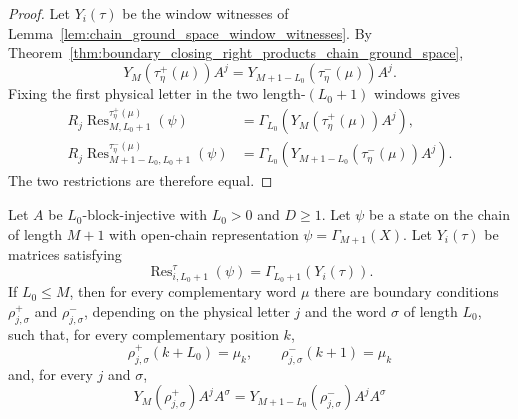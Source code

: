 \begin{proof}
    \notready
    Let $Y_i(\tau)$ be the window witnesses of
    Lemma~\ref{lem:chain_ground_space_window_witnesses}.  By
    Theorem~\ref{thm:boundary_closing_right_products_chain_ground_space},
    \[
        Y_M(\tau^+_\eta(\mu))A^j
        =
        Y_{M+1-L_0}(\tau^-_\eta(\mu))A^j .
    \]
    Fixing the first physical letter in the two length-$(L_0+1)$ windows gives
    \[
    \begin{aligned}
        R_j\operatorname{Res}^{\tau^+_\eta(\mu)}_{M,L_0+1}(\psi)
        &=
        \Gamma_{L_0}\!\left(Y_M(\tau^+_\eta(\mu))A^j\right),\\
        R_j\operatorname{Res}^{\tau^-_\eta(\mu)}_{M+1-L_0,L_0+1}(\psi)
        &=
        \Gamma_{L_0}\!\left(Y_{M+1-L_0}(\tau^-_\eta(\mu))A^j\right).
    \end{aligned}
    \]
    The two restrictions are therefore equal.
\end{proof}

\begin{theorem}
    \label{thm:closure_property_auxiliary_boundary_product_chain_ground_space}
    \leanok
    Let $A$ be $L_0$-block-injective with $L_0>0$ and $D\ge1$. Let $\psi$ be a
    state on the chain of length $M+1$ with open-chain representation
    $\psi=\Gamma_{M+1}(X)$.  Let $Y_i(\tau)$ be matrices satisfying
    \[
        \operatorname{Res}^{\tau}_{i,L_0+1}(\psi)
        =
        \Gamma_{L_0+1}(Y_i(\tau)).
    \]
    If $L_0\le M$, then for every complementary word $\mu$ there are boundary
    conditions $\rho^+_{j,\sigma}$ and $\rho^-_{j,\sigma}$, depending on the
    physical letter $j$ and the word $\sigma$ of length $L_0$, such that, for
    every complementary position $k$,
    \[
        \rho^+_{j,\sigma}(k+L_0)=\mu_k,
        \qquad
        \rho^-_{j,\sigma}(k+1)=\mu_k
    \]
    and, for every $j$ and $\sigma$,
    \[
        Y_M(\rho^+_{j,\sigma})A^jA^\sigma
        =
        Y_{M+1-L_0}(\rho^-_{j,\sigma})A^jA^\sigma
    \]
\end{theorem}

